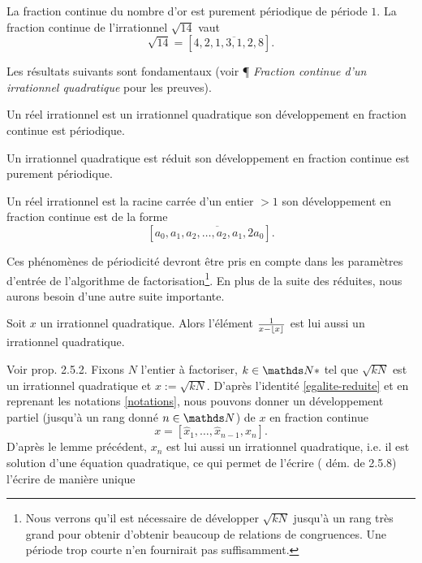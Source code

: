 \begin{exemple}
	La fraction continue du nombre d'or est purement périodique de période $1$.
	La fraction continue de l'irrationnel $\sqrt{14}$ vaut \[\sqrt{14} = [4,
	\overline{2, 1, 3, 1, 2, 8}].\]
\end{exemple}

Les résultats suivants sont fondamentaux (voir \cite{wikiu} ¶ \emph{Fraction
continue d'un irrationnel quadratique} pour les preuves).

\begin{theoreme}[Lagrange, 1770]
	Un réel irrationnel est un irrationnel quadratique \ssi son développement en
	fraction continue est périodique.
\end{theoreme}

\begin{theoreme}[Galois, 1829]
	Un irrationnel quadratique est réduit \ssi son développement en fraction
	continue est purement périodique.
\end{theoreme}

\begin{theoreme}[Legendre, 1798]
	Un réel irrationnel est la racine carrée d'un entier $>1$ \ssi son
	développement en fraction continue est de la forme \[[a_0, \overline{a_1,
	a_2, \dots, a_2, a_1, 2a_0}].\]
\end{theoreme}

Ces phénomènes de périodicité devront être pris en compte dans les paramètres
d'entrée de l'algorithme de factorisation\footnote{Nous verrons qu'il est
nécessaire de développer $\sqrt{kN}$ jusqu'à un rang très grand pour obtenir
d'obtenir beaucoup de relations de congruences. Une période trop courte n'en
fournirait pas suffisamment.}. En plus de la suite des réduites, nous aurons
besoin d'une autre suite importante.

\begin{lemme}
	Soit $x$ un irrationnel quadratique. Alors l'élément $\frac{1}{x - \lfloor x\rfloor}$
	est lui aussi un irrationnel quadratique.
\end{lemme}

Voir \cite{Lauritzen} prop. 2.5.2. Fixons $N$ l'entier à factoriser, $k\in \N*$
tel que $\sqrt{kN}$ est un irrationnel quadratique et $x := \sqrt{kN}$. D'après
l'identité \ref{egalite-reduite} et en reprenant les notations \ref{notations},
nous pouvons donner un développement partiel (jusqu'à un rang donné $n\in \N$)
de $x$ en fraction continue \[x = [\hat{x}_1, \dots, \hat{x}_{n-1}, x_n].\]
D'après le lemme précédent, $x_n$ est lui aussi un irrationnel quadratique,
i.e.  il est solution d'une équation quadratique, ce qui permet de l'écrire
(\cite{Lauritzen} dém. de 2.5.8) l'écrire de manière unique 

